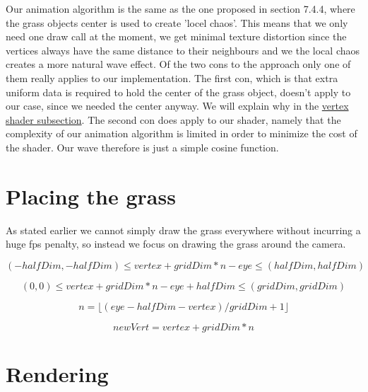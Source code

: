 Our animation algorithm is the same as the one proposed in section
7.4.4, where the grass objects center is used to create 'locel
chaos'. This means that we only need one draw call at the moment, we
get minimal texture distortion since the vertices always have the same
distance to their neighbours and we the local chaos creates a more
natural wave effect. Of the two cons to the approach only one of them
really applies to our implementation. The first con, which is that
extra uniform data is required to hold the center of the grass object,
doesn't apply to our case, since we needed the center anyway. We will
explain why in the \hyperref[sec:grassVert]{vertex shader
  subsection}. The second con does apply to our shader, namely that
the complexity of our animation algorithm is limited in order to
minimize the cost of the shader. Our wave therefore is just a simple
cosine function.

\section{Placing the grass}

As stated earlier we cannot simply draw the grass everywhere without
incurring a huge fps penalty, so instead we focus on drawing the grass
around the camera. %

\begin{displaymath}
  (-halfDim, -halfDim) \le vertex + gridDim * n - eye \le (halfDim, halfDim)
\end{displaymath}

\begin{displaymath}
  (0, 0) \le vertex + gridDim * n - eye + halfDim \le (gridDim, gridDim)
\end{displaymath}

\begin{displaymath}
  n = \lfloor (eye - halfDim - vertex) / gridDim + 1 \rfloor
\end{displaymath}

\begin{displaymath}
  newVert = vertex + gridDim * n
\end{displaymath}



\section{Rendering}


